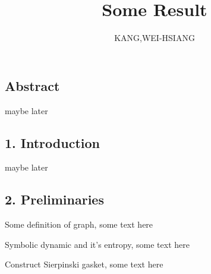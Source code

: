 

\usepackage{tikz}
\usetikzlibrary{lindenmayersystems}

\usepackage{parskip}
\setlength{\parskip}{1em}  %
\setlength{\parindent}{20pt} %
\usepackage{amsmath}
\usepackage{xeCJK}  %
\usepackage[a4paper,margin=1in]{geometry}
\newtheorem{define}{Definition}
\newtheorem{lemma}{Lemma}






\title{Some Result}
\author{KANG,WEI-HSIANG}
\date{}

\maketitle

\subsection*{Abstract}

{\color{blue} maybe later}


\subsection*{1. Introduction}

{\color{blue} maybe later}


\subsection*{2. Preliminaries}


Some definition of graph, {\color{red}some text here}

Symbolic dynamic and it's entropy, {\color{red}some text here}

Construct Sierpinski gasket, {\color{red}some text here}

